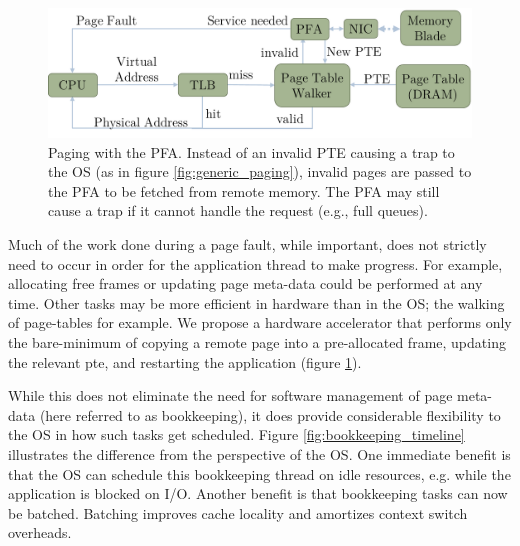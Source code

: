 \begin{figure}[h]
    \centering
    \includegraphics[width=0.9\columnwidth]{figs/generic_pfa.pdf}
    \caption{Paging with the PFA. Instead of an invalid PTE causing a trap to
    the OS (as in figure \ref{fig:generic_paging}), invalid pages are passed to
    the PFA to be fetched from remote memory. The PFA may still cause a trap if
    it cannot handle the request (e.g., full queues).}
    \label{fig:pfa_generic}
\end{figure}

Much of the work done during a page fault, while important, does not strictly
need to occur in order for the application thread to make progress. For
example, allocating free frames or updating page meta-data could be performed at
any time. Other tasks may be more efficient in hardware than in the OS; the
walking of page-tables for example. We propose a hardware accelerator that
performs only the bare-minimum of copying a remote page into a pre-allocated
frame, updating the relevant \gls{pte}, and restarting the application (figure
\ref{fig:pfa_generic}).

While this does not eliminate the need for software management of page meta-data
(here referred to as \gls{bookkeeping}), it does provide considerable flexibility
to the OS in how such \glspl{task} get scheduled. Figure
\ref{fig:bookkeeping_timeline} illustrates the difference from the perspective
of the OS. One immediate benefit is that the OS can schedule this bookkeeping
thread on idle resources, e.g. while the application is blocked on I/O.
Another benefit is that bookkeeping tasks can now be batched. Batching improves
cache locality and amortizes context switch overheads. 

